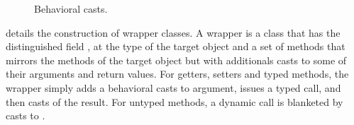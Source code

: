 \documentclass[a4paper,USenglish]{tex/lipics-v2016}
\begin{document}
\begin{figure}[!ht]
\hrulefill

\vspace{-2mm}

{  \small
  \begin{mathpar}

\end{mathpar}}

\vspace{-2mm}
\hrulefill
\caption{Behavioral casts.}\label{behave}
\end{figure}

 details the construction of wrapper classes. A wrapper is a
class that has the distinguished field \that, at the type of the target
object and a set of methods that mirrors the methods of the target object
but with additionals casts to some of their arguments and return values.
For getters, setters and typed methods, the wrapper simply adds a behavioral
casts to argument, issues a typed call, and then casts of the result. For
untyped methods, a dynamic call is blanketed by casts to \any.
\end{document}
